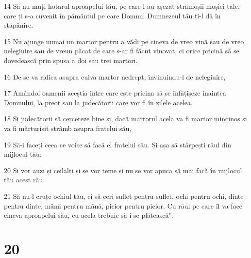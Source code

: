 \par 14 Să nu muți hotarul aproapelui tău, pe care l-au așezat strămoșii moșiei tale, care ți s-a cuvenit în pământul pe care Domnul Dumnezeul tău ți-l dă în stăpânire.
\par 15 Nu ajunge numai un martor pentru a vădi pe cineva de vreo vină sau de vreo nelegiuire sau de vreun păcat de care s-ar fi făcut vinovat, ci orice pricină să se dovedească prin spusa a doi sau trei martori.
\par 16 De se va ridica asupra cuiva martor nedrept, învinuindu-l de nelegiuire,
\par 17 Amândoi oamenii aceștia între care este pricina să se înfățișeze înaintea Domnului, la preot sau la judecătorii care vor fi în zilele acelea.
\par 18 Și judecătorii să cerceteze bine și, dacă martorul acela va fi martor mincinos și va fi mărturisit strâmb asupra fratelui său,
\par 19 Să-i faceți ceea ce voise să facă el fratelui său. Și așa să stârpești răul din mijlocul tău;
\par 20 Și vor auzi și ceilalți și se vor teme și nu se vor apuca să mai facă în mijlocul tău acest rău.
\par 21 Să nu-l cruțe ochiul tău, ci să ceri suflet pentru suflet, ochi pentru ochi, dinte pentru dinte, mână pentru mână, picior pentru picior. Cu răul pe care îl va face cineva-aproapelui său, cu acela trebuie să i se plătească".

\chapter{20}

